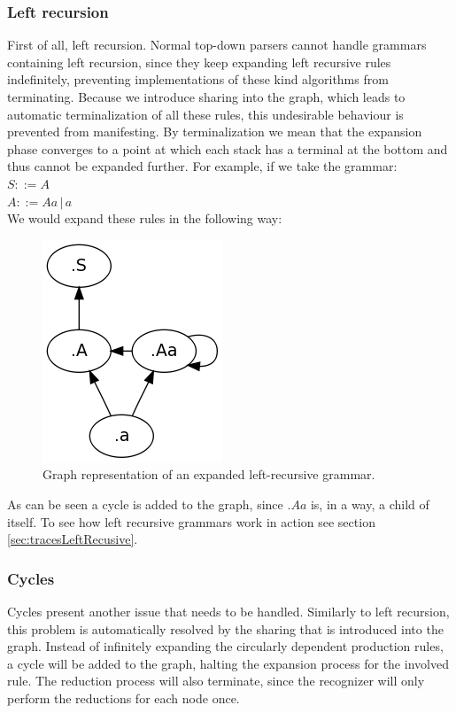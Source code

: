 \documentclass[a4paper,10pt]{article}
\begin{document}
\subsubsection{Left recursion}
First of all, left recursion. Normal top-down parsers cannot handle grammars containing left recursion, since they keep expanding left recursive rules indefinitely, preventing implementations of these kind algorithms from terminating. Because we introduce sharing into the graph, which leads to automatic terminalization of all these rules, this undesirable behaviour is prevented from manifesting. By terminalization we mean that the expansion phase converges to a point at which each stack has a terminal at the bottom and thus cannot be expanded further. For example, if we take the grammar:\\
$S ::= A$\\
$A ::= Aa\,|\,a$\\
We would expand these rules in the following way:
\begin{figure}[H]
\centering
\includegraphics[scale=0.5]{left-recursive.png}
\caption{Graph representation of an expanded left-recursive grammar.}
\end{figure}
As can be seen a cycle is added to the graph, since $.Aa$ is, in a way, a child of itself. To see how left recursive grammars work in action see section \ref{sec:tracesLeftRecusive}.

\subsubsection{Cycles}
Cycles present another issue that needs to be handled. Similarly to left recursion, this problem is automatically resolved by the sharing that is introduced into the graph. Instead of infinitely expanding the circularly dependent production rules, a cycle will be added to the graph, halting the expansion process for the involved rule. The reduction process will also terminate, since the recognizer will only perform the reductions for each node once.
\end{document}
